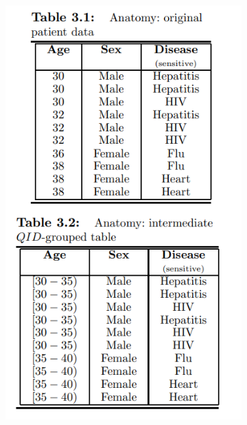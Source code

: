 \documentclass[a4paper, 11pt]{article}
\begin{document}
\begin{figure}[H]
\centering
\begin{subfigure}{.45\textwidth}
    \centering
    \includegraphics[width=\textwidth]{img/fig01.png}
\end{subfigure}%
\begin{subfigure}{.45\textwidth}
    \centering

\end{subfigure}
\end{figure}
\end{document}

